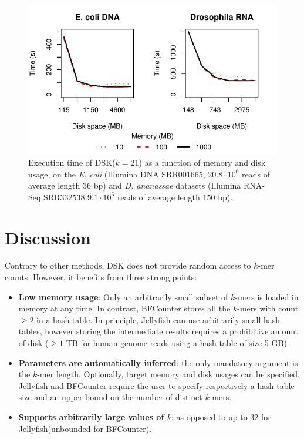 \documentclass{bioinfo}
\newcommand{\dsk}{DSK\xspace}
\newcommand{\jelly}{Jellyfish\xspace}
\newcommand{\bfc}{BFCounter\xspace}
\begin{document}
\begin{figure}[t]
\includegraphics[width=.5\textwidth]{figure}
\caption{Execution time of \dsk ($k=21$) as a function of memory and disk usage, on the \emph{E. coli} (Illumina DNA SRR001665, $20.8\cdot 10^6$ reads of average length $36$ bp) and \emph{D. ananassae} datasets (Illumina RNA-Seq SRR332538 $9.1\cdot 10^6$ reads of average length $150$ bp).}
\end{figure}


\section{Discussion}

Contrary to other methods, \dsk does not provide random access to $k$-mer counts. However, it benefits from three strong points:

\begin{itemize}
\item \textbf{Low memory usage}: Only an arbitrarily small subset of $k$-mers is loaded in memory at any time. In contrast, \bfc stores all the $k$-mers with count $\geq 2$ in a hash table. In principle, \jelly can use arbitrarily small hash tables, however storing the intermediate results requires a prohibitive amount of disk ($\geq 1$ TB for human genome reads using a hash table of size 5 GB).%
\item \textbf{Parameters are automatically inferred}: the only mandatory argument is the $k$-mer length. Optionally, target memory and disk usages can be specified. \jelly and \bfc require the user to specify respectively a hash table size and an upper-bound on the number of distinct $k$-mers.
\item \textbf{Supports arbitrarily large values of $k$}: as opposed to up to $32$ for \jelly (unbounded for \bfc).
\end{itemize}


%
%
\end{document}
